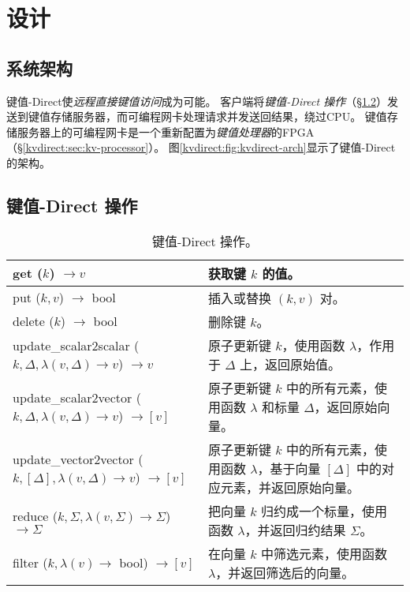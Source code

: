 \section{设计}
\label{kvdirect:sec:architecture}

\subsection{系统架构}

键值-Direct使\textit {远程直接键值访问}成为可能。
客户端将\textit {键值-Direct 操作}（\S \ref {kvdirect:sec:kv-operations}）发送到键值存储服务器，而可编程网卡处理请求并发送回结果，绕过CPU。
键值存储服务器上的可编程网卡是一个重新配置为\textit {键值处理器}的FPGA（\S \ref {kvdirect:sec:kv-processor}）。
图\ref {kvdirect:fig:kvdirect-arch}显示了键值-Direct的架构。

\subsection{键值-Direct 操作}
\label{kvdirect:sec:kv-operations}

\begin{table}
\centering
\caption{键值-Direct 操作。}
\label{kvdirect:tab:kv-operations}

\small
\begin{tabular}{p{}|p{} }
\toprule
get ($k$) $\rightarrow v$ & 获取键 $k$ 的值。 \\
\midrule
put ($k, v$) $\rightarrow$ bool & 插入或替换 $(k, v)$ 对。 \\
\midrule
delete ($k$) $\rightarrow$ bool & 删除键 $k$。 \\
\midrule
\midrule
update{\_}scalar2scalar ($k, \Delta, \lambda(v, \Delta) \rightarrow v$) $\rightarrow v$ & 原子更新键 $k$，使用函数 $\lambda$，作用于 $\Delta$ 上，返回原始值。\\
\midrule
update{\_}scalar2vector ($k, \Delta, \lambda(v, \Delta) \rightarrow v$) $\rightarrow [v]$ & 原子更新键 $k$ 中的所有元素，使用函数 $\lambda$ 和标量 $\Delta$，返回原始向量。 \\
\midrule
update{\_}vector2vector ($k, [\Delta], \lambda(v, \Delta) \rightarrow v$) $\rightarrow [v]$ & 原子更新键 $k$ 中的所有元素，使用函数 $\lambda$，基于向量 $[\Delta]$ 中的对应元素，并返回原始向量。 \\
\midrule
reduce ($k, \Sigma, \lambda(v, \Sigma) \rightarrow \Sigma$) $\rightarrow \Sigma$ & 把向量 $k$ 归约成一个标量，使用函数 $\lambda$，并返回归约结果 $\Sigma$。 \\
\midrule
filter ($k, \lambda(v) \rightarrow$ bool) $\rightarrow [v]$ & 在向量 $k$ 中筛选元素，使用函数 $\lambda$，并返回筛选后的向量。 \\
\bottomrule
\end{tabular}

\end{table}

